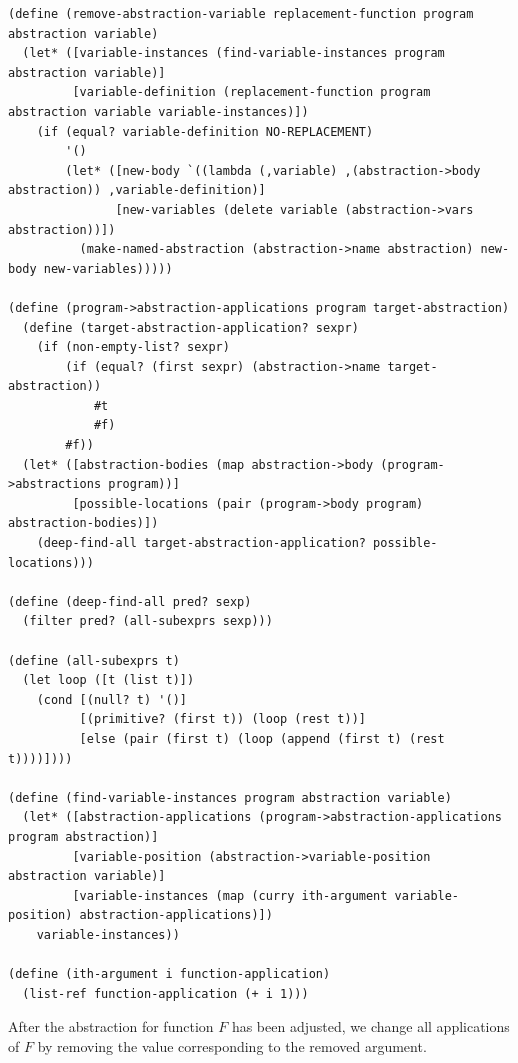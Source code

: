 \documentclass[a4paper,10pt]{article}
\begin{document}
\begin{lstlisting}[frame=trbl]
(define (remove-abstraction-variable replacement-function program abstraction variable)
  (let* ([variable-instances (find-variable-instances program abstraction variable)]
         [variable-definition (replacement-function program abstraction variable variable-instances)])
    (if (equal? variable-definition NO-REPLACEMENT)
        '()
        (let* ([new-body `((lambda (,variable) ,(abstraction->body abstraction)) ,variable-definition)]
               [new-variables (delete variable (abstraction->vars abstraction))])
          (make-named-abstraction (abstraction->name abstraction) new-body new-variables)))))

(define (program->abstraction-applications program target-abstraction)
  (define (target-abstraction-application? sexpr)
    (if (non-empty-list? sexpr)
        (if (equal? (first sexpr) (abstraction->name target-abstraction))
            #t
            #f)
        #f))
  (let* ([abstraction-bodies (map abstraction->body (program->abstractions program))]
         [possible-locations (pair (program->body program) abstraction-bodies)])
    (deep-find-all target-abstraction-application? possible-locations)))

(define (deep-find-all pred? sexp)
  (filter pred? (all-subexprs sexp)))

(define (all-subexprs t)
  (let loop ([t (list t)])
    (cond [(null? t) '()]
          [(primitive? (first t)) (loop (rest t))]
          [else (pair (first t) (loop (append (first t) (rest t))))])))

(define (find-variable-instances program abstraction variable)
  (let* ([abstraction-applications (program->abstraction-applications program abstraction)]
         [variable-position (abstraction->variable-position abstraction variable)]
         [variable-instances (map (curry ith-argument variable-position) abstraction-applications)])
    variable-instances))

(define (ith-argument i function-application)
  (list-ref function-application (+ i 1)))
\end{lstlisting}
After the abstraction for function $F$ has been adjusted, we change all applications of $F$ by removing the value corresponding to the removed argument.
\end{document}
